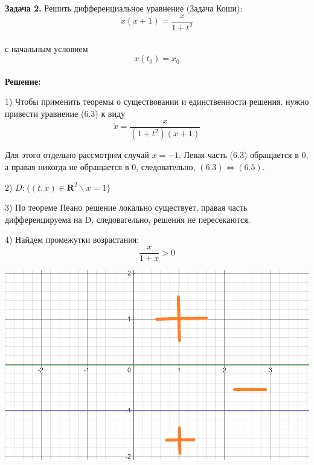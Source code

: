 \documentclass[10pt]{report}
\begin{document}
\textbf{Задача 2.} Решить дифференциальное уравнение (Задача Коши): 
\newline
\begin{equation}
\dot {x}(x+1) = \frac {x} {1+t^2}
\end{equation}\\
с начальным условием
\begin{equation}
x(t_0) = x_0
\end{equation}\\
\textbf{Решение:} \par
1) Чтобы применить теоремы о существовании и единственности решения, нужно привести уравнение (6.3) к виду 
\begin{equation}
\dot {x} = \frac {x} {(1+t^2)(x+1)}
\end{equation}

Для этого отдельно рассмотрим случай $x=-1$. Левая часть (6.3) обращается в 0, а правая никогда не обращается в 0, следовательно, $(6.3) \Leftrightarrow (6.5)$.

2) $D: \{(t,x) \in \textbf{R}^2 \backslash x = 1\}$

3) По теореме Пеано решение локально существует, правая часть дифференцируема на D, следовательно, решения не пересекаются. 

4) Найдем промежутки возрастания:
\[\frac x {1+x} > 0\]
\begin{center}
{\includegraphics[scale=0.4]{graph6.2.png}} 
\end{center}
\end{document}
